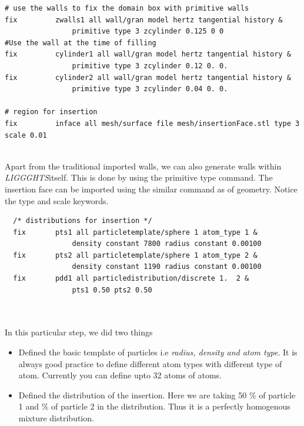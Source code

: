 \documentclass{tufte-book} %
\newcommand{\Li}{\textit{LIGGGHTS}}
\begin{document}
  \begin{verbatim}
# use the walls to fix the domain box with primitive walls
fix 		zwalls1 all wall/gran model hertz tangential history &
                primitive type 3 zcylinder 0.125 0 0
#Use the wall at the time of filling
fix 		cylinder1 all wall/gran model hertz tangential history &
                primitive type 3 zcylinder 0.12 0. 0. 
fix 		cylinder2 all wall/gran model hertz tangential history &
                primitive type 3 zcylinder 0.04 0. 0. 

# region for insertion
fix 		inface all mesh/surface file mesh/insertionFace.stl type 3 scale 0.01


\end{verbatim}
Apart from the traditional imported walls, we can also generate walls within \Li itself. This is done by using the primitive type command. 
The insertion face can be imported using the similar command as of geometry. Notice the type and scale keywords.
\begin{verbatim}
  /* distributions for insertion */
  fix		pts1 all particletemplate/sphere 1 atom_type 1 &
                density constant 7800 radius constant 0.00100
  fix		pts2 all particletemplate/sphere 1 atom_type 2 &
                density constant 1190 radius constant 0.00100
  fix		pdd1 all particledistribution/discrete 1.  2 &
                pts1 0.50 pts2 0.50



              \end{verbatim}
In this particular step, we did two things
\begin{itemize}
\item Defined the basic template of particles i.e \textit{radius, density and atom type}. It is always good practice to define different atom types with different type of atom. Currently you can define upto 32 atoms of atoms.
\item Defined the distribution of the insertion. Here we are taking 50 \% of particle 1 and \% of particle 2 in the distribution. Thus it is a perfectly homogenous mixture distribution.
\end{itemize}
\end{document}
